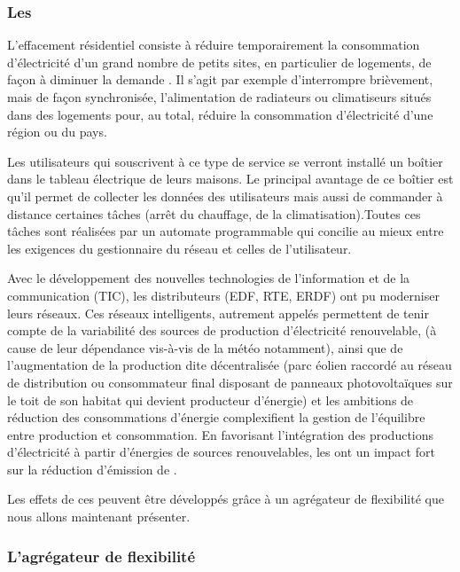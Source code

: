 \subsubsection{Les \smartgrids{}}

L'effacement résidentiel consiste à réduire temporairement la consommation d'électricité d'un grand nombre de petits sites, en particulier de logements, de façon à diminuer la demande \cite{effResidentiel}. Il s'agit par exemple d'interrompre brièvement, mais de façon synchronisée, l'alimentation de radiateurs ou climatiseurs situés dans des logements pour, au total, réduire la consommation d'électricité d'une région ou du pays.

Les utilisateurs qui souscrivent à ce type de service se verront installé un boîtier dans le tableau électrique de leurs maisons. Le principal avantage de ce boîtier est qu’il permet de collecter les données des utilisateurs mais aussi de commander à distance certaines tâches (arrêt du chauffage, de la climatisation).Toutes ces tâches sont réalisées par un automate programmable qui concilie au mieux entre les exigences du gestionnaire du réseau et celles de l'utilisateur.

Avec le développement des nouvelles technologies de l'information et de la communication (TIC), les distributeurs (EDF, RTE, ERDF) ont pu moderniser leurs réseaux. Ces réseaux intelligents, autrement appelés \smartgrids{} permettent de tenir compte de la variabilité des sources de production d'électricité renouvelable, (à cause de leur dépendance vis-à-vis de la météo notamment), ainsi que de l'augmentation de la production dite décentralisée (parc éolien raccordé au réseau de distribution ou consommateur final disposant de panneaux photovoltaïques sur le toit de son habitat qui devient producteur d'énergie) et les ambitions de réduction des consommations d'énergie complexifient la gestion de l'équilibre entre production et consommation. En favorisant l'intégration des productions d'électricité à partir d'énergies de sources renouvelables, les \smartgrids{} ont un impact fort sur la réduction d'émission de .


Les effets de ces \smartgrids{} peuvent être développés grâce à un agrégateur de flexibilité que nous allons maintenant présenter.


\subsubsection{L'agrégateur de flexibilité}


